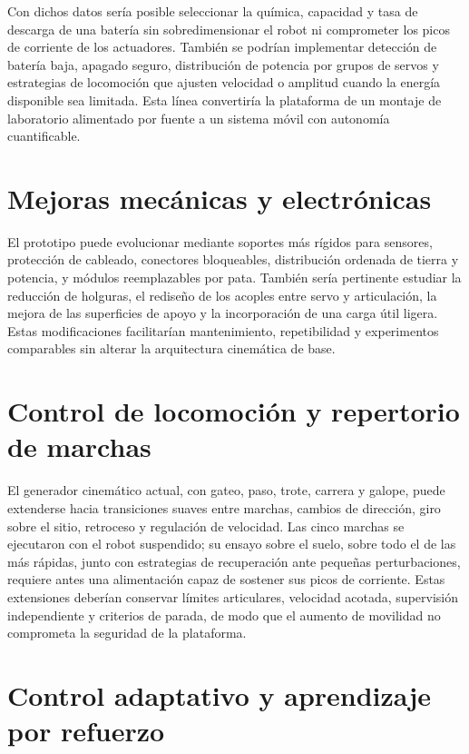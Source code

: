 Con dichos datos sería posible seleccionar la química, capacidad y tasa de
descarga de una batería sin sobredimensionar el robot ni comprometer los picos
de corriente de los actuadores. También se podrían implementar detección de
batería baja, apagado seguro, distribución de potencia por grupos de servos y
estrategias de locomoción que ajusten velocidad o amplitud cuando la energía
disponible sea limitada. Esta línea convertiría la plataforma de un montaje de
laboratorio alimentado por fuente a un sistema móvil con autonomía cuantificable.

\section{Mejoras mecánicas y electrónicas}

El prototipo puede evolucionar mediante soportes más rígidos para sensores,
protección de cableado, conectores bloqueables, distribución ordenada de tierra
y potencia, y módulos reemplazables por pata. También sería pertinente estudiar
la reducción de holguras, el rediseño de los acoples entre servo y articulación,
la mejora de las superficies de apoyo y la incorporación de una carga útil
ligera. Estas modificaciones facilitarían mantenimiento, repetibilidad y
experimentos comparables sin alterar la arquitectura cinemática de base.

\section{Control de locomoción y repertorio de marchas}

El generador cinemático actual, con gateo, paso, trote, carrera y galope, puede
extenderse hacia transiciones suaves entre marchas, cambios de dirección, giro sobre el
sitio, retroceso y regulación de velocidad. Las cinco marchas se
ejecutaron con el robot suspendido; su ensayo sobre el suelo, sobre todo el de las más
rápidas, junto con estrategias de recuperación ante pequeñas perturbaciones, requiere
antes una alimentación capaz de sostener sus picos de corriente. Estas
extensiones deberían conservar límites articulares, velocidad acotada,
supervisión independiente y criterios de parada, de modo que el aumento de
movilidad no comprometa la seguridad de la plataforma.

\section{Control adaptativo y aprendizaje por refuerzo}


